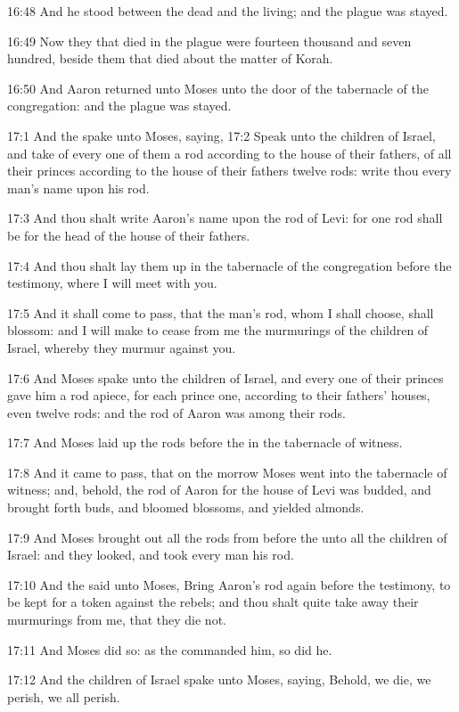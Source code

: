 16:48 And he stood between the dead and the living; and the plague was stayed.

16:49 Now they that died in the plague were fourteen thousand and seven hundred, beside them that died about the matter of Korah.

16:50 And Aaron returned unto Moses unto the door of the tabernacle of the congregation: and the plague was stayed.

17:1 And the \LORD spake unto Moses, saying, 17:2 Speak unto the children of Israel, and take of every one of them a rod according to the house of their fathers, of all their princes according to the house of their fathers twelve rods: write thou every man's name upon his rod.

17:3 And thou shalt write Aaron's name upon the rod of Levi: for one rod shall be for the head of the house of their fathers.

17:4 And thou shalt lay them up in the tabernacle of the congregation before the testimony, where I will meet with you.

17:5 And it shall come to pass, that the man's rod, whom I shall choose, shall blossom: and I will make to cease from me the murmurings of the children of Israel, whereby they murmur against you.

17:6 And Moses spake unto the children of Israel, and every one of their princes gave him a rod apiece, for each prince one, according to their fathers' houses, even twelve rods: and the rod of Aaron was among their rods.

17:7 And Moses laid up the rods before the \LORD in the tabernacle of witness.

17:8 And it came to pass, that on the morrow Moses went into the tabernacle of witness; and, behold, the rod of Aaron for the house of Levi was budded, and brought forth buds, and bloomed blossoms, and yielded almonds.

17:9 And Moses brought out all the rods from before the \LORD unto all the children of Israel: and they looked, and took every man his rod.

17:10 And the \LORD said unto Moses, Bring Aaron's rod again before the testimony, to be kept for a token against the rebels; and thou shalt quite take away their murmurings from me, that they die not.

17:11 And Moses did so: as the \LORD commanded him, so did he.

17:12 And the children of Israel spake unto Moses, saying, Behold, we die, we perish, we all perish.

